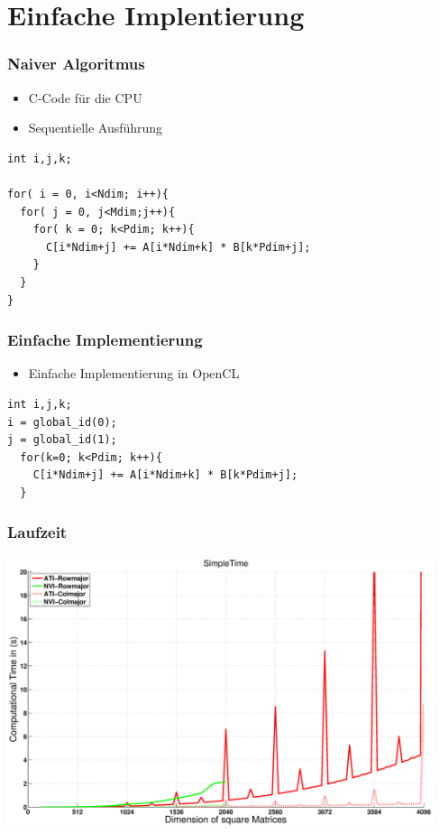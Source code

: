 \documentclass{beamer}
\begin{document}

\section{Einfache Implentierung}



\begin{frame}[fragile]
\frametitle{Naiver Algoritmus}

\begin{itemize}
\item C-Code f\"ur die CPU 
\item Sequentielle Ausf\"uhrung
\end{itemize}

\begin{lstlisting}[style=customc,caption=Matrixmultiplication in C]
int i,j,k;

for( i = 0, i<Ndim; i++){
  for( j = 0, j<Mdim;j++){
    for( k = 0; k<Pdim; k++){
      C[i*Ndim+j] += A[i*Ndim+k] * B[k*Pdim+j]; 
    }
  }
}
\end{lstlisting}



\end{frame}



\begin{frame}[fragile]
\frametitle{Einfache Implementierung}

\begin{itemize}
\item Einfache Implementierung in OpenCL
\end{itemize}

\begin{lstlisting}[style=customc,caption=Einfachster Code in OpenCL]
int i,j,k;
i = global_id(0);
j = global_id(1);
  for(k=0; k<Pdim; k++){
    C[i*Ndim+j] += A[i*Ndim+k] * B[k*Pdim+j]; 
  }
\end{lstlisting}


\end{frame}

\begin{frame}
\frametitle{Laufzeit}
\begin{center}
\includegraphics[width=12.5cm]{SimpleTime}
\end{center}

	
\end{frame}
\end{document}
